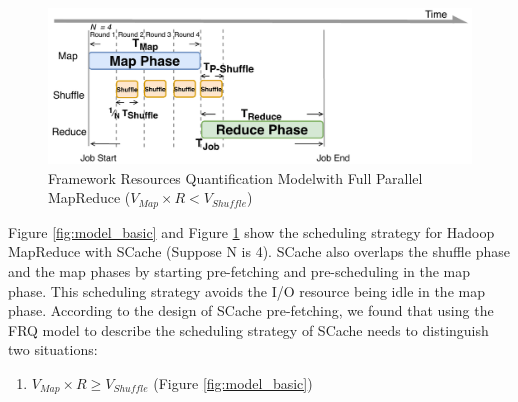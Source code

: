 {%
\begin{figure}
	\centering
	\includegraphics[width=\linewidth]{fig/model_scache2}
	\caption{\color{black}Framework Resources Quantification Model\newline with Full Parallel MapReduce (\(V_{Map} \times R < V_{Shuffle}\))}
	\label{fig:model_scache2}
\end{figure}

Figure \ref{fig:model_basic} and Figure \ref{fig:model_scache2} show the scheduling strategy for Hadoop MapReduce with SCache (Suppose N is 4).
SCache also overlaps the shuffle phase and the map phases by starting pre-fetching and pre-scheduling in the map phase.
This scheduling strategy avoids the I/O resource being idle in the map phase.
According to the design of SCache pre-fetching, we found that using the FRQ model to describe the scheduling strategy of SCache needs to distinguish two situations:

\begin{enumerate}
    \item \(V_{Map} \times R \ge V_{Shuffle}\) (Figure \ref{fig:model_basic})
	 

\end{enumerate}}
